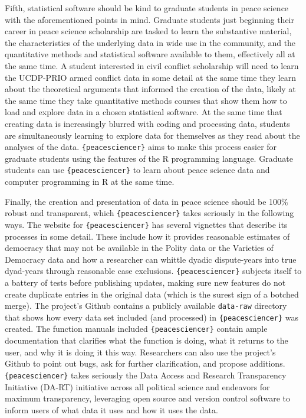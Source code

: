 \documentclass[
  11pt,
]{article}
\begin{document}
Fifth, statistical software should be kind to graduate students in peace science with the aforementioned points in mind. Graduate students just beginning their career in peace science scholarship are tasked to learn the substantive material, the characteristics of the underlying data in wide use in the community, and the quantitative methods and statistical software available to them, effectively all at the same time. A student interested in civil conflict scholarship will need to learn the UCDP-PRIO armed conflict data in some detail at the same time they learn about the theoretical arguments that informed the creation of the data, likely at the same time they take quantitative methods courses that show them how to load and explore data in a chosen statistical software. At the same time that creating data is increasingly blurred with coding and processing data, students are simultaneously learning to explore data for themselves as they read about the analyses of the data. \texttt{\{peacesciencer\}} aims to make this process easier for graduate students using the features of the R programming language. Graduate students can use \texttt{\{peacesciencer\}} to learn about peace science data and computer programming in R at the same time.

Finally, the creation and presentation of data in peace science should be 100\% robust and transparent, which \texttt{\{peacesciencer\}} takes seriously in the following ways. The website for \texttt{\{peacesciencer\}} has several vignettes that describe its processes in some detail. These include how it provides reasonable estimates of democracy that may not be available in the Polity data or the Varieties of Democracy data and how a researcher can whittle dyadic dispute-years into true dyad-years through reasonable case exclusions. \texttt{\{peacesciencer\}} subjects itself to a battery of tests before publishing updates, making sure new features do not create duplicate entries in the original data (which is the surest sign of a botched merge). The project's Github contains a publicly available \texttt{data-raw} directory that shows how every data set included (and processed) in \texttt{\{peacesciencer\}} was created. The function manuals included \texttt{\{peacesciencer\}} contain ample documentation that clarifies what the function is doing, what it returns to the user, and why it is doing it this way. Researchers can also use the project's Github to point out bugs, ask for further clarification, and propose additions. \texttt{\{peacesciencer\}} takes seriously the Data Access and Research Transparency Initiative (DA-RT) initiative across all political science and endeavors for maximum transparency, leveraging open source and version control software to inform users of what data it uses and how it uses the data.
\end{document}

